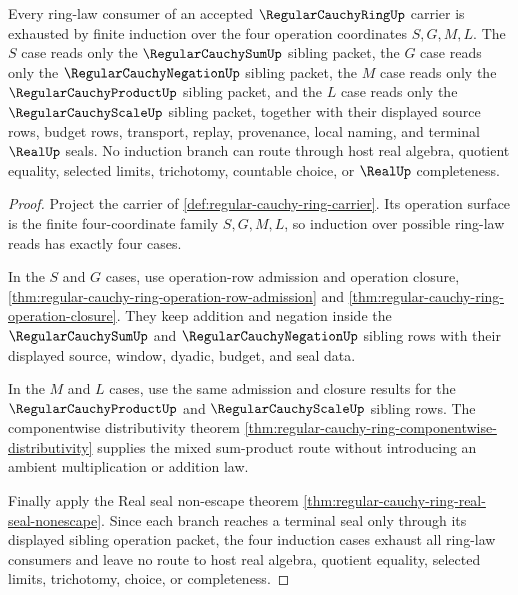 \begin{theorem}
\label{thm:regular-cauchy-ring-finite-operation-induction}
Every ring-law consumer of an accepted $\RegularCauchyRingUp$ carrier is exhausted by finite induction over the four operation coordinates $S,G,M,L$. The $S$ case reads only the $\RegularCauchySumUp$ sibling packet, the $G$ case reads only the $\RegularCauchyNegationUp$ sibling packet, the $M$ case reads only the $\RegularCauchyProductUp$ sibling packet, and the $L$ case reads only the $\RegularCauchyScaleUp$ sibling packet, together with their displayed source rows, budget rows, transport, replay, provenance, local naming, and terminal $\RealUp$ seals. No induction branch can route through host real algebra, quotient equality, selected limits, trichotomy, countable choice, or $\RealUp$ completeness.
\end{theorem}
\begin{proof}
Project the carrier of \autoref{def:regular-cauchy-ring-carrier}. Its operation surface is the finite four-coordinate family $S,G,M,L$, so induction over possible ring-law reads has exactly four cases.

In the $S$ and $G$ cases, use operation-row admission and operation closure, \autoref{thm:regular-cauchy-ring-operation-row-admission} and \autoref{thm:regular-cauchy-ring-operation-closure}. They keep addition and negation inside the $\RegularCauchySumUp$ and $\RegularCauchyNegationUp$ sibling rows with their displayed source, window, dyadic, budget, and seal data.

In the $M$ and $L$ cases, use the same admission and closure results for the $\RegularCauchyProductUp$ and $\RegularCauchyScaleUp$ sibling rows. The componentwise distributivity theorem \autoref{thm:regular-cauchy-ring-componentwise-distributivity} supplies the mixed sum-product route without introducing an ambient multiplication or addition law.

Finally apply the Real seal non-escape theorem \autoref{thm:regular-cauchy-ring-real-seal-nonescape}. Since each branch reaches a terminal seal only through its displayed sibling operation packet, the four induction cases exhaust all ring-law consumers and leave no route to host real algebra, quotient equality, selected limits, trichotomy, choice, or completeness.
\end{proof}

